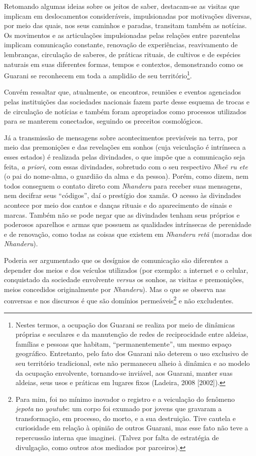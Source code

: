 Retomando algumas ideias sobre os jeitos de saber, destacam-se as
visitas que implicam em deslocamentos consideráveis, impulsionadas por
motivações diversas, por meio das quais, nos seus caminhos e paradas,
transitam também as notícias. Os movimentos e as articulações
impulsionadas pelas relações entre parentelas implicam comunicação
constante, renovação de experiências, reavivamento de lembranças,
circulação de saberes, de práticas rituais, de cultivos e de espécies
naturais em suas diferentes formas, tempos e contextos, demonstrando
como os Guarani se reconhecem em toda a amplidão de seu
território\footnote{Nestes termos, a ocupação dos Guarani se realiza por
  meio de dinâmicas próprias e seculares e da manutenção de redes de
  reciprocidade entre aldeias, famílias e pessoas que habitam,
  ``permanentemente'', um mesmo espaço geográfico. Entretanto, pelo fato
  dos Guarani não deterem o uso exclusivo de seu território tradicional,
  este não permaneceu alheio à dinâmica e ao modelo da ocupação
  envolvente, tornando-se inviável, aos Guarani, manter suas aldeias,
  seus usos e práticas em lugares fixos (Ladeira, 2008 {[}2002{]}).}.

Convém ressaltar que, atualmente, os encontros, reuniões e eventos
agenciados pelas instituições das sociedades nacionais fazem parte desse
esquema de trocas e de circulação de notícias e também foram apropriados
como processos utilizados para se manterem conectados, seguindo os
preceitos cosmológicos.

Já a transmissão de mensagens sobre acontecimentos previsíveis na terra,
por meio das premonições e das revelações em sonhos (cuja veiculação é
intrínseca a esses estados) é realizada pelas divindades, o que impõe
que a comunicação seja feita, \emph{a priori,} com essas divindades,
sobretudo com o seu respectivo \emph{Nheẽ ru ete} (o pai do nome-alma, o
guardião da alma e da pessoa). Porém, como dizem, nem todos conseguem o
contato direto com \emph{Nhanderu} para receber suas mensagens, nem
decifrar seus ``códigos'', daí o prestígio dos xamãs. O acesso às
divindades acontece por meio dos cantos e danças rituais e do
aparecimento de sinais e marcas. Também não se pode negar que as
divindades tenham seus próprios e poderosos aparelhos e armas que
possuem as qualidades intrínsecas de perenidade e de renovação, como
todas as coisas que existem em \emph{Nhanderu retã} (moradas dos
\emph{Nhanderu}).

Poderia ser argumentado que os desígnios de comunicação são diferentes a
depender dos meios e dos veículos utilizados (por exemplo: a internet e
o celular, conquistado da sociedade envolvente \emph{versus} os sonhos,
as visitas e premonições, meios concedidos originalmente por
\emph{Nhanderu}). Mas o que se observa nas conversas e nos discursos é
que são domínios permeáveis\footnote{Para mim, foi no mínimo inovador o
  registro e a veiculação do fenômeno \emph{jepota} no \emph{youtube}:
  um corpo foi exumado por jovens que gravaram a transformação, em
  processo, do morto, e a sua destruição. Tive cautela e curiosidade em
  relação à opinião de outros Guarani, mas esse fato não teve a
  repercussão interna que imaginei. (Talvez por falta de estratégia de
  divulgação, como outros atos mediados por parceiros).} e não
excludentes.

